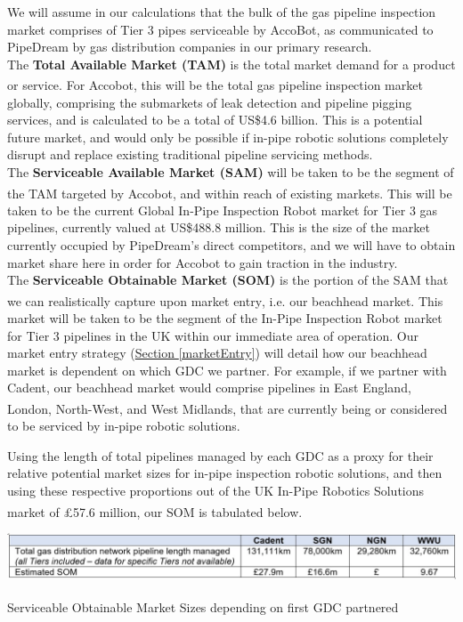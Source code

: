 \documentclass[11pt]{article}		%
\newcommand{\supercite}[1]{\textsuperscript{\cite{#1}}}		%
\newcommand{\sectref}[1]{\hyperref[#1]{Section \ref*{#1}}}     %
\begin{document}
    We will assume in our calculations that the bulk of the gas pipeline inspection market comprises of Tier 3 pipes serviceable by AccoBot, as communicated to PipeDream by gas distribution companies in our primary research. \\ 
    The \textbf{Total Available Market (TAM)} is the total market demand for a product or service\supercite{tamsamsom}. For Accobot, this will be the total gas pipeline inspection market globally, comprising the submarkets of leak detection and pipeline pigging services, and is calculated to be a total of US\$4.6 billion. This is a potential future market, and would only be possible if in-pipe robotic solutions completely disrupt and replace existing traditional pipeline servicing methods. \\
    The \textbf{Serviceable Available Market (SAM) }will be taken to be the segment of the TAM targeted by Accobot, and within reach of existing markets\supercite{tamsamsom}. This will be taken to be the current Global In-Pipe Inspection Robot market for Tier 3 gas pipelines, currently valued at US\$488.8 million.  This is the size of the market currently occupied by PipeDream’s direct competitors, and we will have to obtain market share here in order for Accobot to gain traction in the industry.\\
    The \textbf{Serviceable Obtainable Market (SOM)} is the portion of the SAM that we can realistically capture upon market entry\supercite{tamsamsom}, i.e. our beachhead market. This market will be taken to be the segment of the In-Pipe Inspection Robot market for Tier 3 pipelines in the UK within our immediate area of operation. Our market entry strategy (\sectref{marketEntry}) will detail how our beachhead market is dependent on which GDC we partner. For example, if we partner with Cadent, our beachhead market would comprise pipelines in East England, London, North-West, and West Midlands\supercite{cadentarea}, that are currently being or considered to be serviced by in-pipe robotic solutions. 
    
    Using the length of total pipelines managed by each GDC as a proxy for their relative potential market sizes for in-pipe inspection robotic solutions, and then using these respective proportions out of the UK In-Pipe Robotics Solutions market of £57.6 million\supercite{inpipemkt}, our SOM is tabulated below. 
		\begin{table}[h]
			\centering
			\includegraphics[width=\textwidth]{SOM.jpg}
			\caption{Serviceable Obtainable Market Sizes depending on first GDC partnered\supercite{ltd}}
			\label{SOM}
 		\end{table}
 	\vspace{-0.5cm}
    
\end{document}

